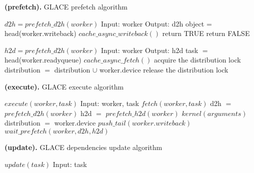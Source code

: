 \documentclass[preprint,11pt]{elsarticle}
\begin{document}
\begin{algorithm}
\caption{{\bf (prefetch).} GLACE prefetch algorithm}
\label{alg:prefetch}
{\footnotesize
\begin{minipage} [t] {0.4\textwidth}
\begin{algorithmic} [1]
\STATE $d2h = prefetch\_d2h(worker)$
\STATE Input: worker
\STATE Output: d2h
  \STATE object = head(worker.writeback)
    \STATE $cache\_async\_writeback()$
    \STATE return TRUE
  \ENDIF
\ENDIF
\STATE return FALSE
\end{algorithmic}
\end{minipage}
\begin{minipage} [t] {0.6\textwidth}
\begin{algorithmic} [1]
\STATE $h2d = prefetch\_d2h(worker)$
\STATE Input: worker
\STATE Output: h2d 
  \STATE task $=$ head(worker.readyqueue)
        \STATE $cache\_async\_fetch()$
        \STATE acquire the distribution lock
        \STATE distribution $=$ distribution $\cup$ worker.device
        \STATE release the distribution lock
      \ENDIF
    \ENDIF
  \ENDFOR
\ENDIF
\end{algorithmic}
\end{minipage}
}
\end{algorithm}

\begin{algorithm}
\caption{{\bf (execute).} GLACE execute algorithm}
\label{alg:execute}
{\footnotesize
\begin{algorithmic} [1]
\STATE $execute(worker, task)$
\STATE Input: worker, task
\STATE $fetch(worker, task)$
\STATE d2h $=$ $prefetch\_d2h(worker)$
\STATE h2d $=$ $prefetch\_h2d(worker)$
\STATE $kernel(arguments)$
  \STATE distribution $=$ worker.device
  \STATE $push\_tail(worker.writeback)$  
\ENDFOR
\STATE $wait\_prefetch(worker, d2h, h2d)$
\end{algorithmic}
}
\end{algorithm}

\begin{algorithm}
\caption{{\bf (update).} GLACE dependencies update algorithm}
\label{alg:update}
{\footnotesize
\begin{algorithmic} [1]
\STATE $update(task)$
\STATE Input: task
\STATE
\end{algorithmic}
}
\end{algorithm}
\end{document}
